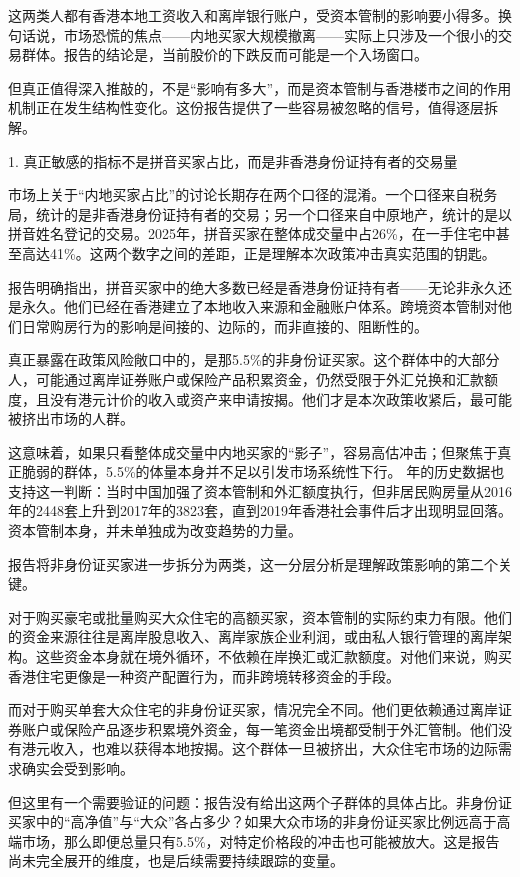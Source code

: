 \documentclass[11pt]{ctexart}
\begin{document}
这两类人都有香港本地工资收入和离岸银行账户，受资本管制的影响要小得多。换句话说，市场恐慌的焦点——内地买家大规模撤离——实际上只涉及一个很小的交易群体。报告的结论是，当前股价的下跌反而可能是一个入场窗口。

但真正值得深入推敲的，不是“影响有多大”，而是资本管制与香港楼市之间的作用机制正在发生结构性变化。这份报告提供了一些容易被忽略的信号，值得逐层拆解。

1. 真正敏感的指标不是拼音买家占比，而是非香港身份证持有者的交易量

市场上关于“内地买家占比”的讨论长期存在两个口径的混淆。一个口径来自税务局，统计的是非香港身份证持有者的交易；另一个口径来自中原地产，统计的是以拼音姓名登记的交易。2025年，拼音买家在整体成交量中占26\%，在一手住宅中甚至高达41\%。这两个数字之间的差距，正是理解本次政策冲击真实范围的钥匙。

报告明确指出，拼音买家中的绝大多数已经是香港身份证持有者——无论非永久还是永久。他们已经在香港建立了本地收入来源和金融账户体系。跨境资本管制对他们日常购房行为的影响是间接的、边际的，而非直接的、阻断性的。

真正暴露在政策风险敞口中的，是那5.5\%的非身份证买家。这个群体中的大部分人，可能通过离岸证券账户或保险产品积累资金，仍然受限于外汇兑换和汇款额度，且没有港元计价的收入或资产来申请按揭。他们才是本次政策收紧后，最可能被挤出市场的人群。

这意味着，如果只看整体成交量中内地买家的“影子”，容易高估冲击；但聚焦于真正脆弱的群体，5.5\%的体量本身并不足以引发市场系统性下行。 年的历史数据也支持这一判断：当时中国加强了资本管制和外汇额度执行，但非居民购房量从2016年的2448套上升到2017年的3823套，直到2019年香港社会事件后才出现明显回落。资本管制本身，并未单独成为改变趋势的力量。

报告将非身份证买家进一步拆分为两类，这一分层分析是理解政策影响的第二个关键。

对于购买豪宅或批量购买大众住宅的高额买家，资本管制的实际约束力有限。他们的资金来源往往是离岸股息收入、离岸家族企业利润，或由私人银行管理的离岸架构。这些资金本身就在境外循环，不依赖在岸换汇或汇款额度。对他们来说，购买香港住宅更像是一种资产配置行为，而非跨境转移资金的手段。

而对于购买单套大众住宅的非身份证买家，情况完全不同。他们更依赖通过离岸证券账户或保险产品逐步积累境外资金，每一笔资金出境都受制于外汇管制。他们没有港元收入，也难以获得本地按揭。这个群体一旦被挤出，大众住宅市场的边际需求确实会受到影响。

但这里有一个需要验证的问题：报告没有给出这两个子群体的具体占比。非身份证买家中的“高净值”与“大众”各占多少？如果大众市场的非身份证买家比例远高于高端市场，那么即便总量只有5.5\%，对特定价格段的冲击也可能被放大。这是报告尚未完全展开的维度，也是后续需要持续跟踪的变量。
\end{document}
